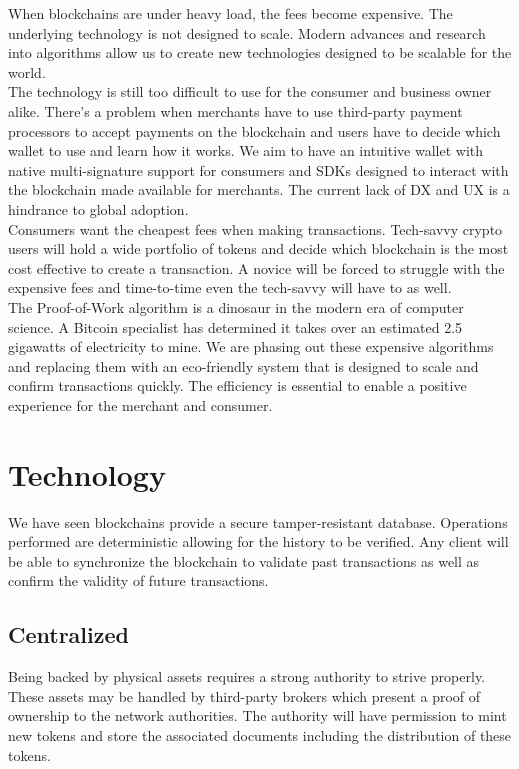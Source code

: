 \documentclass[12pt,a4paper]{article}
\begin{document}
  When blockchains are under heavy load, the fees become expensive. The
  underlying technology is not designed to scale. Modern advances and research
  into algorithms allow us to create new technologies designed to be scalable
  for the world.\\

  The technology is still too difficult to use for the consumer and business
  owner alike. There's a problem when merchants have to use third-party payment
  processors to accept payments on the blockchain and users have to decide which
  wallet to use and learn how it works. We aim to have an intuitive wallet with
  native multi-signature support for consumers and SDKs designed to interact
  with the blockchain made available for merchants. The current lack of DX and
  UX is a hindrance to global adoption.\\

  Consumers want the cheapest fees when making transactions. Tech-savvy crypto
  users will hold a wide portfolio of tokens and decide which blockchain is the
  most cost effective to create a transaction. A novice will be forced to
  struggle with the expensive fees and time-to-time even the tech-savvy will
  have to as well.\\

  \newpage
  The Proof-of-Work algorithm is a dinosaur in the modern era of computer
  science. A Bitcoin specialist has determined it takes over an estimated 2.5
  gigawatts of electricity to mine. We are phasing out these expensive
  algorithms and replacing them with an eco-friendly system that is designed to
  scale and confirm transactions quickly. The efficiency is essential to enable
  a positive experience for the merchant and consumer.\\

  \section{Technology}
  We have seen blockchains provide a secure tamper-resistant database.
  Operations performed are deterministic allowing for the history to be
  verified. Any client will be able to synchronize the blockchain to validate
  past transactions as well as confirm the validity of future transactions.\\

  \subsection{Centralized}
  Being backed by physical assets requires a strong authority to strive
  properly. These assets may be handled by third-party brokers which present a
  proof of ownership to the network authorities. The authority will have
  permission to mint new tokens and store the associated documents including
  the distribution of these tokens.
\end{document}
